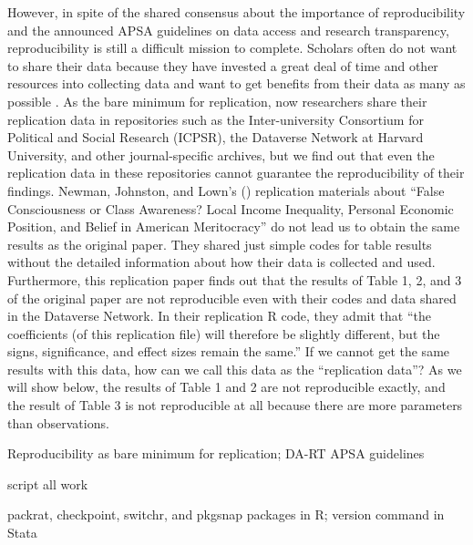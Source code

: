 However, in spite of the shared consensus about the importance of reproducibility and the announced APSA guidelines on data access and research transparency, reproducibility is still a difficult mission to complete. Scholars often do not want to share their data because they have invested a great deal of time and other resources into collecting data and want to get benefits from their data as many as possible \citep{Lupia2014}. As the bare minimum for replication, now researchers share their replication data in repositories such as the Inter-university Consortium for Political and Social Research (ICPSR), the Dataverse Network at Harvard University, and other journal-specific archives, but we find out that even the replication data in these repositories cannot guarantee the reproducibility of their findings. Newman, Johnston, and Lown's (\citeyear{Newman2015a}) replication materials about ``False Consciousness or Class Awareness? Local Income Inequality, Personal Economic Position, and Belief in American Meritocracy'' do not lead us to obtain the same results as the original paper. They shared just simple codes for table results without the detailed information about how their data is collected and used. Furthermore, this replication paper finds out that the results of Table 1, 2, and 3 of the original paper are not reproducible even with their codes and data shared in the Dataverse Network. In their replication R code, they admit that ``the coefficients (of this replication file) will therefore be slightly different, but the signs, significance, and effect sizes remain the same.'' If we cannot get the same results with this data, how can we call this data as the ``replication data''? As we will show below, the results of Table 1 and 2 are not reproducible exactly, and the result of Table 3 is not reproducible at all because there are more parameters than observations. 


Reproducibility as bare minimum for replication; DA-RT APSA guidelines

script all work

packrat, checkpoint, switchr, and pkgsnap packages in R; version command in Stata




